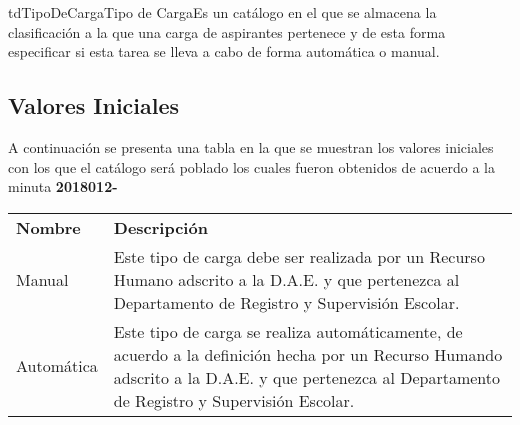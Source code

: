 \begin{TipoDeDato}{tdTipoDeCarga}{Tipo de Carga}{Es un catálogo en el que se almacena la clasificación a la que una carga de aspirantes pertenece y de esta forma especificar si esta tarea se lleva a cabo de forma automática o manual.}
	
	\begin{tdAtributos}
			
			
	\end{tdAtributos}

	\subsection{Valores Iniciales}

	A continuación se presenta una tabla en la que se muestran los valores iniciales con los que el catálogo será poblado los cuales fueron obtenidos de acuerdo a la minuta \textbf{2018012- }\cdtEmpty
		\begin{longtable}{|p{}|p{}|}
				\hline
				\rowcolor{colorPrincipal}
	 			\multicolumn{2}{c}{\bf \color{white} Valores Iniciales}\\
	 			\hline
	 			\rowcolor{colorSecundario}
	 			\bf\color{white}Nombre & \bf\color{white}Descripción\\
	 			\hline
	 			Manual & Este tipo de carga debe ser realizada por un Recurso Humano adscrito a la D.A.E. y que pertenezca al Departamento de Registro y Supervisión Escolar.\\
	 			\hline
	 			Automática & Este tipo de carga se realiza automáticamente, de acuerdo a la definición hecha por un Recurso Humando adscrito a la D.A.E. y que pertenezca al Departamento de Registro y Supervisión Escolar.\\
	 			\hline
		\end{longtable}

\end{TipoDeDato}

